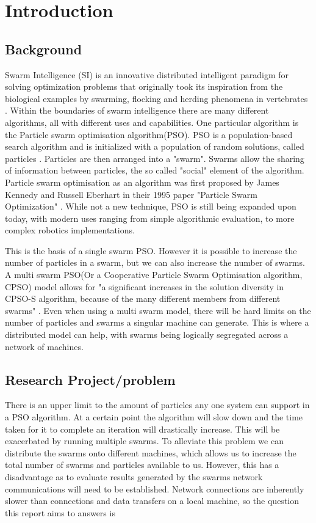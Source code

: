 \documentclass[oneside,12pt]{book}
\begin{document}

\chapter{Introduction}
\section{Background}
\par Swarm Intelligence (SI) is an innovative distributed intelligent paradigm for solving optimization problems that originally took its inspiration from the biological examples by swarming, flocking and herding phenomena in vertebrates \cite{abraham_guo_liu_2006}.
Within the boundaries of swarm intelligence there are many different algorithms, all with different uses and capabilities. One particular algorithm is the Particle swarm optimisation algorithm(PSO). PSO is a population-based search algorithm and is initialized with a population of random solutions, called particles \cite{shi_2004}. Particles are then arranged into a "swarm". Swarms allow the sharing of information between particles, the so called "social" element of the algorithm. Particle swarm optimisation as an algorithm was first proposed by James Kennedy  and Russell Eberhart in their 1995 paper "Particle Swarm Optimization" \cite{kennedy_eberhart_1995}. While not a new technique, PSO is still being expanded upon today, with modern uses ranging from simple algorithmic evaluation, to more complex robotics implementations. 

This is the basis of a single swarm PSO. However it is possible to increase the number of particles in a swarm, but we can also increase the number of swarms. A multi swarm PSO(Or a Cooperative Particle Swarm Optimisation algorithm, CPSO) model allows for "a significant increases in the solution diversity in CPSO-S algorithm, because of the many different members from different swarms" \cite{vandenbergh_engelbrecht_2004}. Even when using a multi swarm model, there will be hard limits on the number of particles and swarms a singular machine can generate. This is where a distributed model can help, with swarms being logically segregated across a network of machines.

\section{Research Project/problem}
There is an upper limit to the amount of particles any one system can support in a PSO algorithm. At a certain point the algorithm will slow down and the time taken for it to complete an iteration will drastically increase. This will be exacerbated by running multiple swarms. 
To alleviate this problem we can distribute the swarms onto different machines, which allows us to increase the total number of swarms and particles available to us. However, this has a disadvantage as to evaluate results generated by the swarms network communications will need to be established. Network connections are inherently slower than connections and data transfers on a local machine, so the question this report aims to answers is
\end{document}
